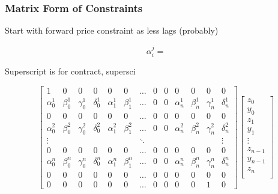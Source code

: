 \documentclass{article}
\begin{document}
\subsubsection{Matrix Form of Constraints}


Start with forward price constraint as less lags (probably)

\begin{equation}
    \alpha^j_i = 
\end{equation}

Superscript is for contract, supersci

\begin{equation*}
    \begin{bmatrix}
        1 & 0 & 0 & 0 & 0 & 0 & \hdots & 0 & 0 & 0 & 0 & 0 & 0 \\
        \alpha^1_0 & \beta^1_0 & \gamma^1_0 & \delta^1_0 & \alpha^1_1 & \beta^1_1 & \hdots & 0 & 0 & \alpha^1_n & \beta^1_n & \gamma^1_n & \delta^1_n \\
        0 & 0 & 0 & 0 & 0 & 0 & \hdots & 0 & 0 & 0 & 0 & 0 & 0 \\
        \alpha^2_0 & \beta^2_0 & \gamma^2_0 & \delta^2_0 & \alpha^2_1 & \beta^2_1 & \hdots & 0 & 0 & \alpha^2_n & \beta^2_n & \gamma^2_n & \delta^2_n \\        
        \vdots & & & & & & \ddots & & & & & & \vdots \\
        0 & 0 & 0 & 0 & 0 & 0 & \hdots & 0 & 0 & 0 & 0 & 0 & 0 \\
        \alpha^n_0 & \beta^n_0 & \gamma^n_0 & \delta^n_0 & \alpha^n_1 & \beta^n_1 & \hdots & 0 & 0 & \alpha^n_n & \beta^n_n & \gamma^n_n & \delta^n_n \\
        0 & 0 & 0 & 0 & 0 & 0 & \hdots & 0 & 0 & 0 & 0 & 0 & 0 \\
        0 & 0 & 0 & 0 & 0 & 0 & \hdots & 0 & 0 & 0 & 0 & 1 & 0 
    \end{bmatrix}
    \begin{bmatrix}
        z_0 \\
        y_0 \\
        z_1 \\
        y_1 \\
        \vdots \\
        z_{n-1} \\
        y_{n-1} \\
        z_n \\

\end{bmatrix}
\end{equation*}
\end{document}
